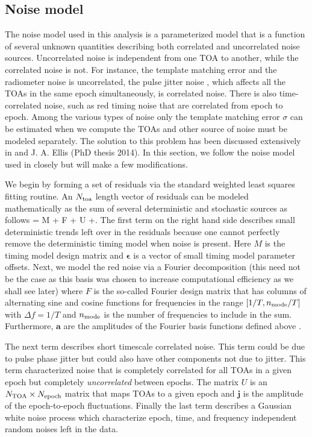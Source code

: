 \subsection{Noise model}
\label{sec:noise}
{\B The noise model used in this analysis is a parameterized model that is a function of several unknown quantities describing both correlated and uncorrelated noise sources. Uncorrelated noise is 
independent from one TOA to another, while the correlated noise is not. 
For instance, the template matching error and the radiometer noise is
uncorrelated, the pulse jitter noise \citep{sc10}, which affects all the TOAs 
in the same epoch simultaneously, is correlated noise.
There is also time-correlated noise, such as red timing noise that are
correlated from epoch to epoch. Among the various types of noise only the
template matching error $\sigma$ can be estimated when we compute the TOAs and 
other source of noise must be modeled separately. The solution to this problem has been discussed extensively in \citet{vl13, ell13, vv14a, vv14, abb+14} and J. A. Ellis (PhD thesis 2014). In this section, we follow the noise model used in \citet{abb+14} closely but will make a few modifications.

We begin by forming a set of residuals via the standard weighted least squares fitting routine. An $N_{\rm toa}$ length vector of  residuals can be modeled mathematically as the sum of several deterministic and stochastic sources as follows
\be
\delta{} = M\boldsymbol{\epsilon} + F + U +.
\ee
The first term on the right hand side describes small deterministic trends
left over in the residuals because one cannot perfectly remove the
deterministic timing model when noise is present. Here $M$ is the timing model
design matrix and $\boldsymbol{\epsilon}$ is a vector of small timing model
parameter offsets. Next, we model the red noise via a Fourier decomposition
(this need not be the case as this basis was chosen to increase computational
efficiency as we shall see later) where $F$ is the so-called Fourier design
matrix that has columns of alternating sine and cosine functions for
frequencies in the range $[1/T,n_{\rm mode}/T]$ with $\Delta f=1/T$ and
$n_{\rm mode}$ is the number of frequencies to include in the sum.
Furthermore, $\mathbf{a}$ are the amplitudes of the Fourier basis functions
defined above \citep[see][for more details]{lah+13,abb+14}. 

The next term
describes short timescale correlated noise. This term could be due to pulse
phase jitter but could also have other components not due to jitter. This term
characterized noise that is completely correlated for all TOAs in a given
epoch but completely \emph{uncorrelated} between epochs. The matrix $U$ is an
$N_{\rm TOA}\times N_{\rm epoch}$ matrix that maps TOAs to a given epoch and
$\mathbf{j}$ is the amplitude of the epoch-to-epoch fluctuations. Finally the
last term describes a Gaussian white noise process which characterize
epoch, time, and frequency independent random noises left in the data. %

}
